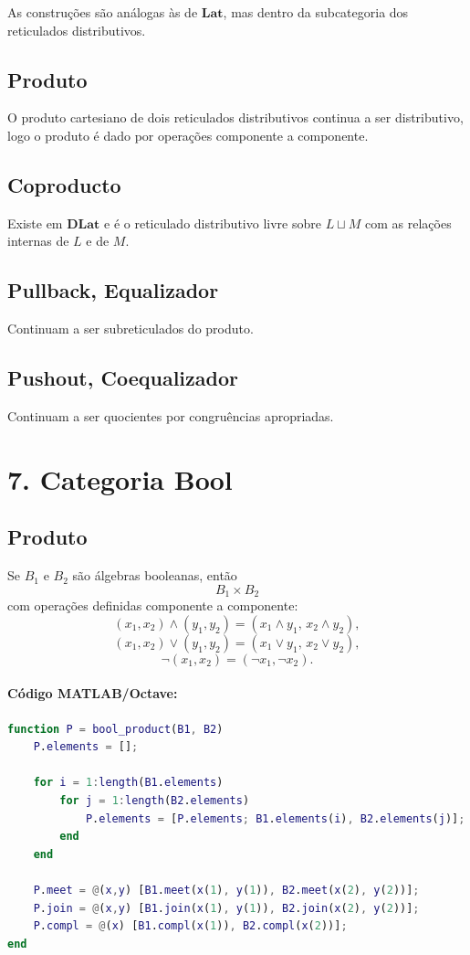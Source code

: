 \documentclass[a4paper,12pt]{article}
\begin{document}
As construções são análogas às de $\mathbf{Lat}$, mas dentro da subcategoria dos
reticulados distributivos.

\subsection*{Produto}

O produto cartesiano de dois reticulados distributivos continua a ser
distributivo, logo o produto é dado por operações componente a componente.

\subsection*{Coproducto}

Existe em $\mathbf{DLat}$ e é o reticulado distributivo livre sobre
$L\sqcup M$ com as relações internas de $L$ e de $M$.

\subsection*{Pullback, Equalizador}

Continuam a ser subreticulados do produto.

\subsection*{Pushout, Coequalizador}

Continuam a ser quocientes por congruências apropriadas.

\section*{7. Categoria \(\mathbf{Bool}\)}

\subsection*{Produto}

Se $B_1$ e $B_2$ são álgebras booleanas, então
\[
B_1\times B_2
\]
com operações definidas componente a componente:
\[
(x_1,x_2)\wedge(y_1,y_2)=(x_1\wedge y_1,\, x_2\wedge y_2),
\]
\[
(x_1,x_2)\vee(y_1,y_2)=(x_1\vee y_1,\, x_2\vee y_2),
\]
\[
\neg(x_1,x_2)=(\neg x_1,\neg x_2).
\]

\paragraph{Código MATLAB/Octave:}
\begin{lstlisting}[language=Matlab]
function P = bool_product(B1, B2)
    P.elements = [];
    
    for i = 1:length(B1.elements)
        for j = 1:length(B2.elements)
            P.elements = [P.elements; B1.elements(i), B2.elements(j)];
        end
    end
    
    P.meet = @(x,y) [B1.meet(x(1), y(1)), B2.meet(x(2), y(2))];
    P.join = @(x,y) [B1.join(x(1), y(1)), B2.join(x(2), y(2))];
    P.compl = @(x) [B1.compl(x(1)), B2.compl(x(2))];
end
\end{lstlisting}
\end{document}
